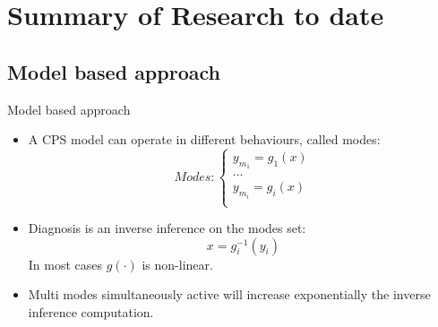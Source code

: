 \documentclass{beamer}
\def\itemizespace{\vspace{7mm}}
\begin{document}
\section{Summary of Research to date}

\subsection{Model based approach}
\begin{frame}{Model based approach}
	\begin{itemize}[<+->]
		\item[] A CPS model can operate in different behaviours, called modes:
			\[
				Modes:	\begin{cases}
							y_{m_1} = g_1(x)	\\
							...					\\
							y_{m_i} = g_i(x)	\\
						\end{cases}
			\]

		\itemizespace%

		\item[] Diagnosis is an inverse inference on the modes set: 
			$$ x = g^{-1}_{i}(y_i) $$ 
			In most cases $ g( \cdot ) $ is non-linear.

		\itemizespace%

		\item[] Multi modes simultaneously active will increase exponentially
			the inverse inference computation.
    \end{itemize}
\end{frame}
\end{document}
